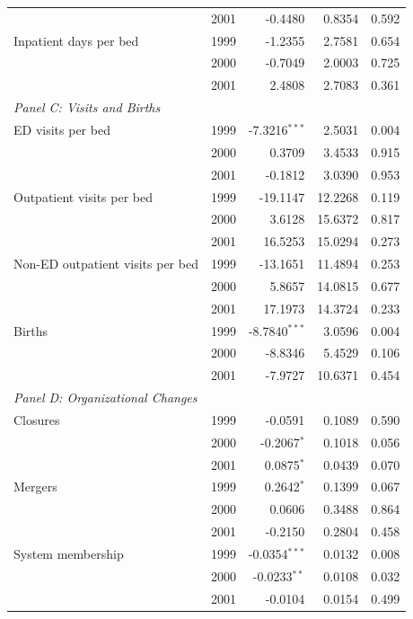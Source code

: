 \begin{tabular}{l c r r r}
 & 2001 & -0.4480 & 0.8354 & 0.592 \\
Inpatient days per bed & 1999 & -1.2355 & 2.7581 & 0.654 \\
 & 2000 & -0.7049 & 2.0003 & 0.725 \\
 & 2001 & 2.4808 & 2.7083 & 0.361 \\
\midrule
\multicolumn{5}{l}{\textit{Panel C: Visits and Births}} \\
ED visits per bed & 1999 & -7.3216$^{***}$ & 2.5031 & 0.004 \\
 & 2000 & 0.3709 & 3.4533 & 0.915 \\
 & 2001 & -0.1812 & 3.0390 & 0.953 \\
Outpatient visits per bed & 1999 & -19.1147 & 12.2268 & 0.119 \\
 & 2000 & 3.6128 & 15.6372 & 0.817 \\
 & 2001 & 16.5253 & 15.0294 & 0.273 \\
Non-ED outpatient visits per bed & 1999 & -13.1651 & 11.4894 & 0.253 \\
 & 2000 & 5.8657 & 14.0815 & 0.677 \\
 & 2001 & 17.1973 & 14.3724 & 0.233 \\
Births & 1999 & -8.7840$^{***}$ & 3.0596 & 0.004 \\
 & 2000 & -8.8346 & 5.4529 & 0.106 \\
 & 2001 & -7.9727 & 10.6371 & 0.454 \\
\midrule
\multicolumn{5}{l}{\textit{Panel D: Organizational Changes}} \\
Closures & 1999 & -0.0591 & 0.1089 & 0.590 \\
 & 2000 & -0.2067$^{*}$ & 0.1018 & 0.056 \\
 & 2001 & 0.0875$^{*}$ & 0.0439 & 0.070 \\
Mergers & 1999 & 0.2642$^{*}$ & 0.1399 & 0.067 \\
 & 2000 & 0.0606 & 0.3488 & 0.864 \\
 & 2001 & -0.2150 & 0.2804 & 0.458 \\
System membership & 1999 & -0.0354$^{***}$ & 0.0132 & 0.008 \\
 & 2000 & -0.0233$^{**}$ & 0.0108 & 0.032 \\
 & 2001 & -0.0104 & 0.0154 & 0.499 \\
\bottomrule
\end{tabular}
